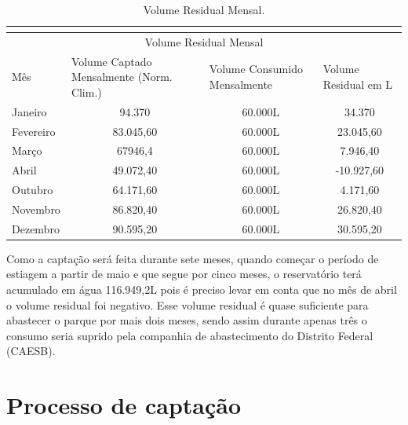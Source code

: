 \begin{table}[h]
\centering
\caption{Volume Residual Mensal.}
\label{Volume Residual Mensal.}
\begin{tabular}{lccc}
 & \multicolumn{1}{l}{} & \multicolumn{1}{l}{} & \multicolumn{1}{l}{} \\ \hline
\multicolumn{4}{|c|}{Volume Residual Mensal} \\ \hline
\multicolumn{1}{|l|}{Mês} & \multicolumn{1}{l|}{Volume Captado Mensalmente (Norm. Clim.)} & \multicolumn{1}{l|}{Volume Consumido Mensalmente} & \multicolumn{1}{l|}{Volume Residual em L} \\ \hline
\multicolumn{1}{|l|}{Janeiro} & \multicolumn{1}{c|}{94.370} & \multicolumn{1}{c|}{60.000L} & \multicolumn{1}{c|}{34.370} \\ \hline
\multicolumn{1}{|l|}{Fevereiro} & \multicolumn{1}{c|}{83.045,60} & \multicolumn{1}{c|}{60.000L} & \multicolumn{1}{c|}{23.045,60} \\ \hline
\multicolumn{1}{|l|}{Março} & \multicolumn{1}{c|}{67946,4} & \multicolumn{1}{c|}{60.000L} & \multicolumn{1}{c|}{7.946,40} \\ \hline
\multicolumn{1}{|l|}{Abril} & \multicolumn{1}{c|}{49.072,40} & \multicolumn{1}{c|}{60.000L} & \multicolumn{1}{c|}{-10.927,60} \\ \hline
\multicolumn{1}{|l|}{Outubro} & \multicolumn{1}{c|}{64.171,60} & \multicolumn{1}{c|}{60.000L} & \multicolumn{1}{c|}{4.171,60} \\ \hline
\multicolumn{1}{|l|}{Novembro} & \multicolumn{1}{c|}{86.820,40} & \multicolumn{1}{c|}{60.000L} & \multicolumn{1}{c|}{26.820,40} \\ \hline
\multicolumn{1}{|l|}{Dezembro} & \multicolumn{1}{c|}{90.595,20} & \multicolumn{1}{c|}{60.000L} & \multicolumn{1}{c|}{30.595,20} \\ \hline
\end{tabular}
\end{table}

Como a captação será feita durante sete meses, quando começar o período de estiagem a partir de maio e que segue por cinco meses, o reservatório terá acumulado em água 116.949,2L pois é preciso levar em conta que no mês de abril o volume residual foi negativo. Esse volume residual é quase suficiente para abastecer o parque por mais dois meses, sendo assim durante apenas três o consumo seria suprido pela companhia de abastecimento do Distrito Federal (CAESB).

\section{Processo de captação}

